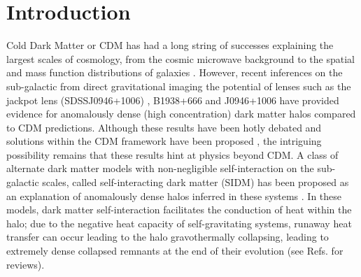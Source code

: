\documentclass[%
 reprint,
 amsmath,
 amssymb,
 aps,
]{revtex4-2}
\begin{document}
\maketitle



\section{Introduction}

Cold Dark Matter or CDM has had a long string of successes explaining the largest scales of cosmology, from the cosmic microwave background \citet{planck2020results}  to the spatial and mass function distributions of galaxies \cite{white1978core,white1991galaxy,de2008high,weinberg2015cold}. 
However, recent inferences on the sub-galactic from direct gravitational imaging the potential of lenses such as the jackpot lens (SDSSJ0946+1006) \cite{vegetti2010detection, minor2021unexpected}, B1938+666 and J0946+1006 \cite{tajalli2025sharp} have provided evidence for anomalously dense (high concentration) dark matter halos compared to CDM predictions.
Although these results have been hotly debated and solutions within the CDM framework have been proposed \cite{he2025not}, the intriguing possibility remains that these results hint at physics beyond CDM.
A class of alternate dark matter models with non-negligible self-interaction on the sub-galactic scales, called self-interacting dark matter (SIDM) has been proposed as an explanation of anomalously dense halos inferred in these systems \cite{zhang2025gd}.
In these models, dark matter self-interaction facilitates the conduction of heat within the halo; due to the negative heat capacity of self-gravitating systems, runaway heat transfer can occur leading to the halo gravothermally collapsing, leading to extremely dense collapsed remnants at the end of their evolution (see Refs. \cite{tulin2018dark,adhikari2025astrophysical} for reviews).
\end{document}
